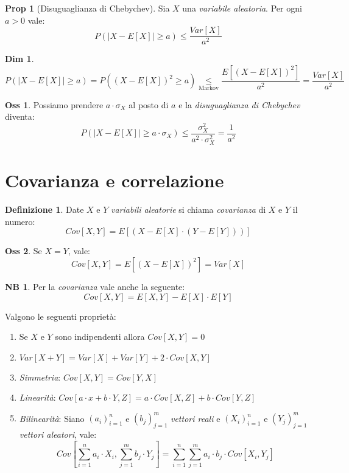 \documentclass[12pt, a4paper]{report}
\theoremstyle{definition}
\newtheorem{definition}{Definizione}[section]
\newtheorem*{demonstration}{Dim}
\newtheorem*{proposition}{Prop}
\newtheorem*{observation}{Oss}
\newtheorem*{note}{NB}
\newcommand\underrel[2]{\mathrel{\mathop{#2}\limits_{#1}}}%
\begin{document}
\begin{proposition}[Disuguaglianza di Chebychev]
	Sia $X$ una \emph{variabile aleatoria}. Per ogni $a>0$ vale:
	\[P(|X-E[X]|\geq a)\leq \frac{Var[X]}{a^2}\]
\end{proposition}
\begin{demonstration}
	\[P(|X-E[X]|\geq a)=P((X-E[X])^2\geq a)\underrel{\text{Markov}}{\leq}\frac
	{E[(X-E[X])^2]}{a^2}=\frac{Var[X]}{a^2}\]
\end{demonstration}
\begin{observation}
	Possiamo prendere \(a\cdot \sigma_X\) al posto di $a$ e la \emph{disuguaglianza
	di Chebychev} diventa:
	\[P(|X-E[X]|\geq a\cdot \sigma_X)\leq\frac{\sigma_X^2}{a^2\cdot \sigma_X^2}=\frac{1}{a^2}\]
\end{observation}

\section{Covarianza e correlazione}

\begin{definition}
	Date $X$ e $Y$ \emph{variabili aleatorie} si chiama \emph{covarianza} di $X$
	e $Y$ il numero:
	\[Cov[X,Y]=E[(X-E[X]\cdot (Y-E[Y]))]\]
\end{definition}
\begin{observation}
	Se \(X=Y\), vale:
	\[Cov[X,Y]=E[(X-E[X])^2]=Var[X]\]
\end{observation}
\begin{note}
	Per la \emph{covarianza} vale anche la seguente:
	\[Cov[X,Y]=E[X,Y]-E[X]\cdot E[Y]\]
\end{note}

Valgono le seguenti proprietà:
\begin{enumerate}[label=(\roman*)]
	\item Se $X$ e $Y$ sono indipendenti allora \(Cov[X,Y]=0\)
	\item \(Var[X+Y]=Var[X]+Var[Y]+2\cdot Cov[X,Y]\)
	\item \emph{Simmetria}: \(Cov[X,Y]=Cov[Y,X]\)
	\item \emph{Linearità}: \(Cov[a\cdot x+b\cdot Y,Z]=a\cdot Cov[X,Z]+b\cdot Cov[Y,Z]\)
	\item \emph{Bilinearità}: Siano $(a_i)_{i=1}^n$ e $(b_j)_{j=1}^m$
	\emph{vettori reali} e $(X_i)_{i=1}^n$ e $(Y_j)_{j=1}^m$ \emph{vettori aleatori},
	vale:
	\[Cov\left[\sum_{i=1}^na_i\cdot X_i,\sum_{j=1}^mb_j\cdot Y_j\right]=\sum_{i=1}^n
	\sum_{j=1}^ma_i\cdot b_j\cdot Cov[X_i,Y_j]\]
\end{enumerate}
\end{document}
